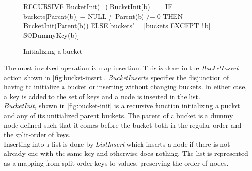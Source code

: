 \documentclass{uit-thesis}
\begin{document}
\begin{figure}
    \begin{tla}
        RECURSIVE BucketInit(_)
        BucketInit(b) == IF buckets[Parent(b)] = NULL /\ Parent(b) /= 0
                            THEN BucketInit(Parent(b))
                            ELSE buckets' = [buckets EXCEPT ![b] = SODummyKey(b)]
    \end{tla}
\begin{tlatex}
%
%
\end{tlatex}
    \caption{Initializing a bucket}
    \label{fig:bucket-init}
\end{figure}

The most involved operation is map insertion. This is done in the \textit{BucketInsert} action shown in \autoref{fig:bucket-insert}. \textit{BucketInserts} specifies the disjunction of having to initialize a bucket or inserting without changing buckets. In either case, a key is added to the set of keys and a node is inserted in the list.\\
\textit{BucketInit}, shown in \autoref{fig:bucket-init} is a recursive function initializing a pucket and any of its unitialized parent buckets. The parent of a bucket is a dummy node defined such that it comes before the bucket both in the regular order and the split-order of keys.\\
Inserting into a list is done by \textit{ListInsert} which inserts a node if there is not already one with the same key and otherwise does nothing. The list is represented as a mapping from split-order keys to values, preserving the order of nodes.
\end{document}
